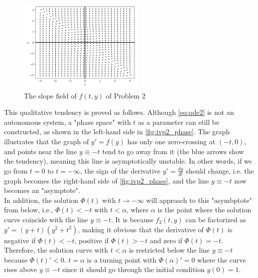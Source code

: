 \documentclass[a4paper]{article}
\begin{document}
	\begin{figure}[H]
		\centering
		\includegraphics[width=6cm]{img/slope_field2.png}
		\caption{\label{fig:slope_field2} The slope field of $f(t, y)$ of Problem 2}
	\end{figure}
	
	\begin{table}[H]
		\centering
		\caption{Using Four Euler Method to Compute y Value}
		\label{tab:IVP2_y}
	\end{table}
	
	This qualitative tendency is proved as follows. Although \autoref{eq:ode2} is not an autonomous system, a "phase space" with $t$ as a parameter can still be constructed, as shown in the left-hand side in \autoref{fig:ivp2_phase}. The graph illustrates that the graph of $y' = f(y)$ has only one zero-crossing at $(-t, 0)$, and points near the line $y \equiv -t$ tend to go away from it (the blue arrows show the tendency), meaning this line is asymptotically unstable. In other words, if we go from $t = 0$ to $t = -\infty$, the sign of the derivative $y' = \frac{dy}{dt}$ should change, i.e. the graph becomes the right-hand side of \autoref{fig:ivp2_phase}, and the line $y \equiv -t$ now becomes an "asymptote". \\
	
	In addition, the solution $\Phi(t)$ with $t \rightarrow -\infty$ will approach to this "asymbptote" from below, i.e., $\Phi(t) < -t$ with $t < \alpha$, where $\alpha$ is the point where the solution curve coincide with the line $y \equiv -t$. It is because $f_2(t, y)$ can be factorized as $y' = (y + t)(y^2 + t^2)$, making it obvious that the derivative of $\Phi(t)$ is negative if $\Phi(t) < -t$, positive if $\Phi(t) > -t$ and zero if $\Phi(t) = -t$. Therefore, the solution curve with $t < \alpha$ is restricted below the line $y \equiv -t$ because $\Phi(t)' < 0$. $t = \alpha$ is a turning point with $\Phi(\alpha)' = 0$ where the curve rises above $y \equiv -t$ since it should go through the initial condition $y(0) = 1$.
	
\end{document}
